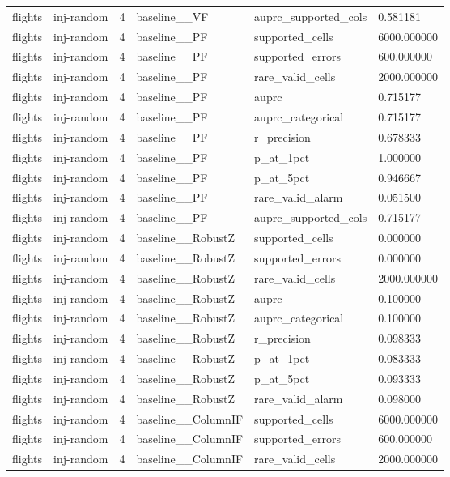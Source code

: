 \begin{tabular}{llllll}
flights & inj-random & 4 & baseline\_\_VF & auprc\_supported\_cols & 0.581181 \\
flights & inj-random & 4 & baseline\_\_PF & supported\_cells & 6000.000000 \\
flights & inj-random & 4 & baseline\_\_PF & supported\_errors & 600.000000 \\
flights & inj-random & 4 & baseline\_\_PF & rare\_valid\_cells & 2000.000000 \\
flights & inj-random & 4 & baseline\_\_PF & auprc & 0.715177 \\
flights & inj-random & 4 & baseline\_\_PF & auprc\_categorical & 0.715177 \\
flights & inj-random & 4 & baseline\_\_PF & r\_precision & 0.678333 \\
flights & inj-random & 4 & baseline\_\_PF & p\_at\_1pct & 1.000000 \\
flights & inj-random & 4 & baseline\_\_PF & p\_at\_5pct & 0.946667 \\
flights & inj-random & 4 & baseline\_\_PF & rare\_valid\_alarm & 0.051500 \\
flights & inj-random & 4 & baseline\_\_PF & auprc\_supported\_cols & 0.715177 \\
flights & inj-random & 4 & baseline\_\_RobustZ & supported\_cells & 0.000000 \\
flights & inj-random & 4 & baseline\_\_RobustZ & supported\_errors & 0.000000 \\
flights & inj-random & 4 & baseline\_\_RobustZ & rare\_valid\_cells & 2000.000000 \\
flights & inj-random & 4 & baseline\_\_RobustZ & auprc & 0.100000 \\
flights & inj-random & 4 & baseline\_\_RobustZ & auprc\_categorical & 0.100000 \\
flights & inj-random & 4 & baseline\_\_RobustZ & r\_precision & 0.098333 \\
flights & inj-random & 4 & baseline\_\_RobustZ & p\_at\_1pct & 0.083333 \\
flights & inj-random & 4 & baseline\_\_RobustZ & p\_at\_5pct & 0.093333 \\
flights & inj-random & 4 & baseline\_\_RobustZ & rare\_valid\_alarm & 0.098000 \\
flights & inj-random & 4 & baseline\_\_ColumnIF & supported\_cells & 6000.000000 \\
flights & inj-random & 4 & baseline\_\_ColumnIF & supported\_errors & 600.000000 \\
flights & inj-random & 4 & baseline\_\_ColumnIF & rare\_valid\_cells & 2000.000000 \\

\end{tabular}
